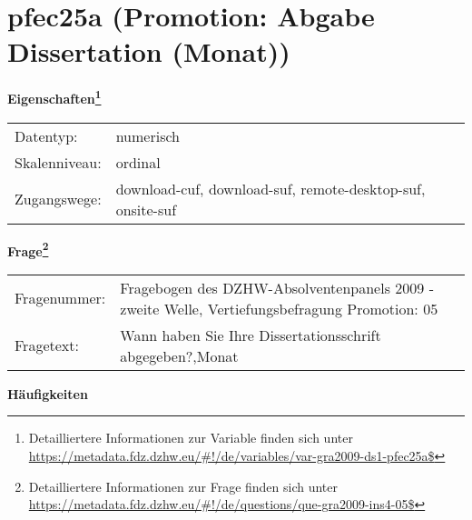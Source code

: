 
    \setcounter{footnote}{0}

    \vspace*{-1.8cm}
	\section{pfec25a (Promotion: Abgabe Dissertation (Monat))}
	\label{section:pfec25a}



    \vspace*{0.5cm}
    \noindent\textbf{Eigenschaften\footnote{Detailliertere Informationen zur Variable finden sich unter
		\url{https://metadata.fdz.dzhw.eu/\#!/de/variables/var-gra2009-ds1-pfec25a$}}}\\
	\begin{tabularx}{\hsize}{@{}lX}
	Datentyp: & numerisch \\
	Skalenniveau: & ordinal \\
	Zugangswege: &
	  download-cuf, 
	  download-suf, 
	  remote-desktop-suf, 
	  onsite-suf
 \\
    \end{tabularx}



				\vspace*{0.5cm}
                \noindent\textbf{Frage\footnote{Detailliertere Informationen zur Frage finden sich unter
		              \url{https://metadata.fdz.dzhw.eu/\#!/de/questions/que-gra2009-ins4-05$}}}\\
				\begin{tabularx}{\hsize}{@{}lX}
					Fragenummer: &
					  Fragebogen des DZHW-Absolventenpanels 2009 - zweite Welle, Vertiefungsbefragung Promotion:
					  05
 \\
					Fragetext: & Wann haben Sie Ihre Dissertationsschrift abgegeben?,Monat \\
				\end{tabularx}





        		\vspace*{0.5cm}
                \noindent\textbf{Häufigkeiten}

